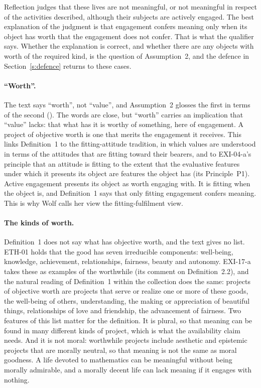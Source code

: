 Reflection judges that these lives are not meaningful, or not meaningful in respect of the activities described, although their subjects are actively engaged. The best explanation of the judgment is that engagement confers meaning only when its object has worth that the engagement does not confer. That is what the qualifier says. Whether the explanation is correct, and whether there are any objects with worth of the required kind, is the question of Assumption~2, and the defence in Section~\ref{s:defence} returns to these cases.

\paragraph{\enquote{Worth}.} The text says \enquote{worth}, not \enquote{value}, and Assumption~2 glosses the first in terms of the second (). The words are close, but \enquote{worth} carries an implication that \enquote{value} lacks: that what has it is worthy of something, here of engagement. A project of objective worth is one that merits the engagement it receives. This links Definition~1 to the fitting-attitude tradition, in which values are understood in terms of the attitudes that are fitting toward their bearers, and to EXI-04-a's principle that an attitude is fitting to the extent that the evaluative features under which it presents its object are features the object has (its Principle~P1). Active engagement presents its object as worth engaging with. It is fitting when the object is, and Definition~1 says that only fitting engagement confers meaning. This is why Wolf calls her view the fitting-fulfilment view.

\paragraph{The kinds of worth.} Definition~1 does not say what has objective worth, and the text gives no list. ETH-01 holds that the good has seven irreducible components: well-being, knowledge, achievement, relationships, fairness, beauty and autonomy. EXI-17-a takes these as examples of the worthwhile (its comment on Definition~2.2), and the natural reading of Definition~1 within the collection does the same: projects of objective worth are projects that serve or realize one or more of these goods, the well-being of others, understanding, the making or appreciation of beautiful things, relationships of love and friendship, the advancement of fairness. Two features of this list matter for the definition. It is plural, so that meaning can be found in many different kinds of project, which is what the availability claim needs. And it is not moral: worthwhile projects include aesthetic and epistemic projects that are morally neutral, so that meaning is not the same as moral goodness. A life devoted to mathematics can be meaningful without being morally admirable, and a morally decent life can lack meaning if it engages with nothing.

